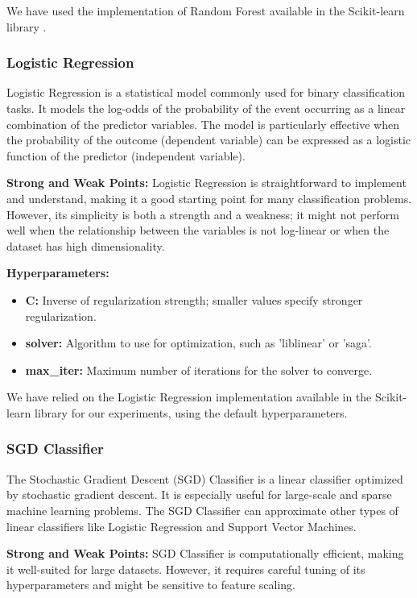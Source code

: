 We have used the implementation of Random Forest available in the Scikit-learn library \cite{ScikitLearn}.

\subsubsection{Logistic Regression}

Logistic Regression is a statistical model commonly used for binary classification tasks. It models the log-odds of the probability of the event occurring as a linear combination of the predictor variables. The model is particularly effective when the probability of the outcome (dependent variable) can be expressed as a logistic function of the predictor (independent variable).

\textbf{Strong and Weak Points:}
Logistic Regression is straightforward to implement and understand, making it a good starting point for many classification problems. However, its simplicity is both a strength and a weakness; it might not perform well when the relationship between the variables is not log-linear or when the dataset has high dimensionality.

\textbf{Hyperparameters:}
\begin{itemize}
  \item \textbf{C:} Inverse of regularization strength; smaller values specify stronger regularization.
  \item \textbf{solver:} Algorithm to use for optimization, such as 'liblinear' or 'saga'.
  \item \textbf{max\_iter:} Maximum number of iterations for the solver to converge.
\end{itemize}

We have relied on the Logistic Regression implementation available in the Scikit-learn library for our experiments\cite{ScikitLearn}, using the default hyperparameters.

\subsubsection{SGD Classifier}

The Stochastic Gradient Descent (SGD) Classifier is a linear classifier optimized by stochastic gradient descent. It is especially useful for large-scale and sparse machine learning problems. The SGD Classifier can approximate other types of linear classifiers like Logistic Regression and Support Vector Machines.

\textbf{Strong and Weak Points:}
SGD Classifier is computationally efficient, making it well-suited for large datasets. However, it requires careful tuning of its hyperparameters and might be sensitive to feature scaling.

